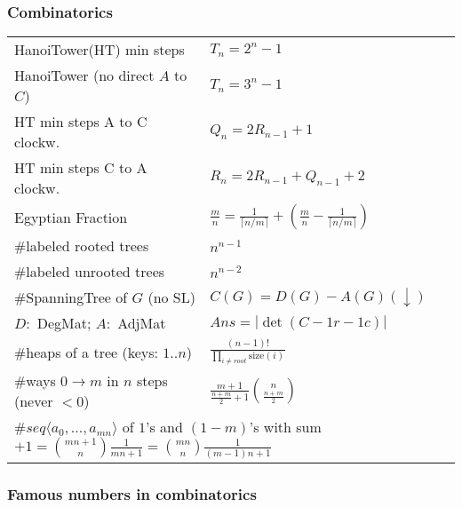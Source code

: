 \documentclass[landscape,a4paper,twocolumn,10pt]{report}
\begin{document}
\subsubsection*{Combinatorics}

\begin{center}
\begin{tabular}{@{}ll@{}}
HanoiTower(HT) min steps & $T_n = 2^n - 1$ \\
HanoiTower (no direct $A$ to $C$) & $T_n = 3^n - 1$ \\
HT min steps A to C clockw.& $Q_n=2R_{n-1}+1$ \\
HT min steps C to A clockw.& $R_n=2R_{n-1}+Q_{n-1}+2$ \\
Egyptian Fraction & $\frac{m}{n}=\frac{1}{\lceil n/m \rceil}+(\frac{m}{n}-\frac{1}{\lceil n/m \rceil})$ \\
\#labeled rooted trees & $n^{n-1}$ \\
\#labeled unrooted trees & $n^{n-2}$ \\
\#SpanningTree of $G$ (no SL) & $C(G)=D(G)-A(G)(\downarrow)$ \\
$D:$ DegMat; $A:$ AdjMat & $Ans=|\det(C-1r-1c)|$ \\
\#heaps of a tree (keys: $1..n$) & $\frac{(n-1)!}{\prod_{i\neq root} \mathrm{size}(i)}$ \\
\#ways $0\rightarrow m$ in $n$ steps (never $<0$) & $\frac{m+1}{\tfrac{n+m}2+1}\binom{n}{\tfrac{n+m}2}$ \\
\multicolumn{2}{l}{$\#seq\langle a_0,...,a_{mn} \rangle$ of $1$'s and $(1-m)$'s with sum $+1 = \binom{mn+1}{n}\frac{1}{mn+1}=\binom{mn}{n}\frac{1}{(m-1)n+1}$ } \\
\end{tabular}
\end{center}

\subsubsection*{Famous numbers in combinatorics}
\end{document}
